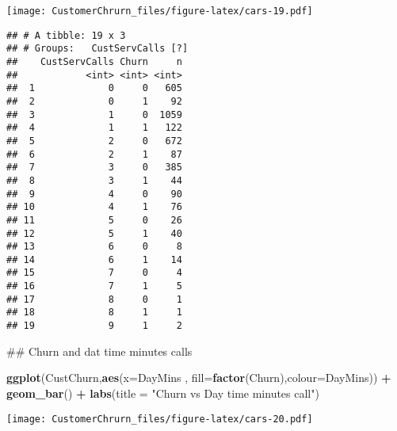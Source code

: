 \documentclass[]{article}
\newenvironment{Shaded}{\begin{snugshade}}{\end{snugshade}}
\newcommand{\KeywordTok}[1]{\textcolor[rgb]{0.13,0.29,0.53}{\textbf{#1}}}
\newcommand{\DataTypeTok}[1]{\textcolor[rgb]{0.13,0.29,0.53}{#1}}
\newcommand{\StringTok}[1]{\textcolor[rgb]{0.31,0.60,0.02}{#1}}
\newcommand{\CommentTok}[1]{\textcolor[rgb]{0.56,0.35,0.01}{\textit{#1}}}
\newcommand{\OperatorTok}[1]{\textcolor[rgb]{0.81,0.36,0.00}{\textbf{#1}}}
\newcommand{\NormalTok}[1]{#1}
\begin{document}
\texttt{[image: CustomerChrurn\_files/figure-latex/cars-19.pdf]}

\begin{Shaded}
\end{Shaded}

\begin{verbatim}
## # A tibble: 19 x 3
## # Groups:   CustServCalls [?]
##    CustServCalls Churn     n
##            <int> <int> <int>
##  1             0     0   605
##  2             0     1    92
##  3             1     0  1059
##  4             1     1   122
##  5             2     0   672
##  6             2     1    87
##  7             3     0   385
##  8             3     1    44
##  9             4     0    90
## 10             4     1    76
## 11             5     0    26
## 12             5     1    40
## 13             6     0     8
## 14             6     1    14
## 15             7     0     4
## 16             7     1     5
## 17             8     0     1
## 18             8     1     1
## 19             9     1     2
\end{verbatim}

\begin{Shaded}
\begin{Highlighting}[]
\NormalTok{## Churn and dat time minutes calls }

\KeywordTok{ggplot}\NormalTok{(CustChurn,}\KeywordTok{aes}\NormalTok{(}\DataTypeTok{x=}\NormalTok{DayMins  , }\DataTypeTok{fill=}\KeywordTok{factor}\NormalTok{(Churn),}\DataTypeTok{colour=}\NormalTok{DayMins))  }\OperatorTok{+}\StringTok{ }\KeywordTok{geom_bar}\NormalTok{() }\OperatorTok{+}
\KeywordTok{labs}\NormalTok{(}\DataTypeTok{title =} \StringTok{"Churn vs Day time minutes call"}\NormalTok{)}
\end{Highlighting}
\end{Shaded}

\texttt{[image: CustomerChrurn\_files/figure-latex/cars-20.pdf]}

\begin{Shaded}
\end{Shaded}
\end{document}
